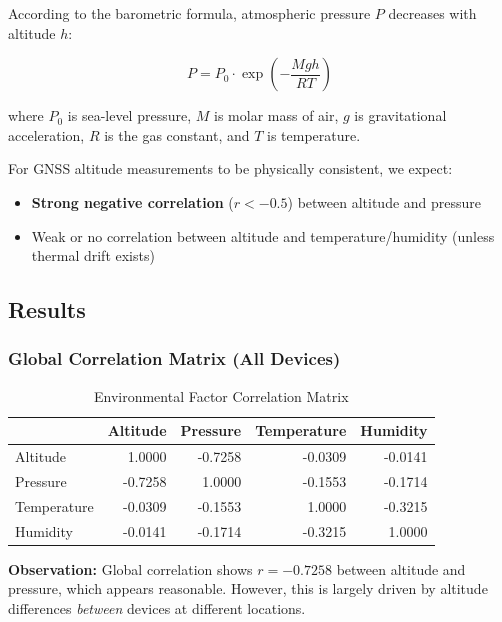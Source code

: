 \documentclass[11pt,a4paper]{article}
\begin{document}
According to the barometric formula, atmospheric pressure $P$ decreases with altitude $h$:

\begin{equation}
P = P_0 \cdot \exp\left(-\frac{Mgh}{RT}\right)
\end{equation}

where $P_0$ is sea-level pressure, $M$ is molar mass of air, $g$ is gravitational acceleration, $R$ is the gas constant, and $T$ is temperature.

For GNSS altitude measurements to be physically consistent, we expect:
\begin{itemize}
    \item \textbf{Strong negative correlation} ($r < -0.5$) between altitude and pressure
    \item Weak or no correlation between altitude and temperature/humidity (unless thermal drift exists)
\end{itemize}

\subsection{Results}

\subsubsection{Global Correlation Matrix (All Devices)}

\begin{table}[H]
\centering
\caption{Environmental Factor Correlation Matrix}
\begin{tabular}{lrrrr}
\toprule
 & \textbf{Altitude} & \textbf{Pressure} & \textbf{Temperature} & \textbf{Humidity} \\
\midrule
Altitude & 1.0000 & \textcolor{tier3}{-0.7258} & -0.0309 & -0.0141 \\
Pressure & -0.7258 & 1.0000 & -0.1553 & -0.1714 \\
Temperature & -0.0309 & -0.1553 & 1.0000 & -0.3215 \\
Humidity & -0.0141 & -0.1714 & -0.3215 & 1.0000 \\
\bottomrule
\end{tabular}
\end{table}

\textbf{Observation:} Global correlation shows $r = -0.7258$ between altitude and pressure, which appears reasonable. However, this is largely driven by altitude differences \textit{between} devices at different locations.
\end{document}
